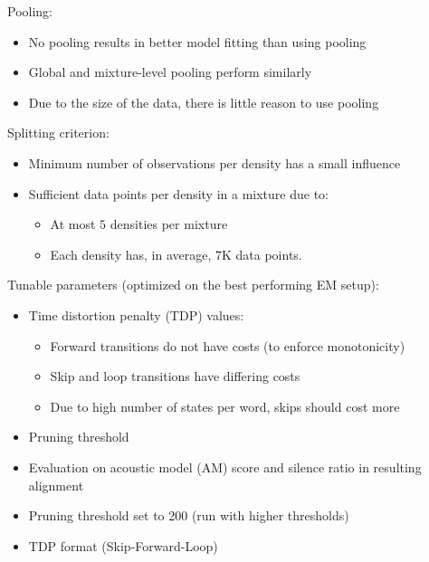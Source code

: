 \documentclass[11pt, a4paper, landscape]{article}
\begin{document}
\NewPage{}
\vfill
Pooling:
\begin{itemize}
	\item No pooling results in better model fitting than using pooling 
	\item Global and mixture-level pooling perform similarly 
  \item Due to the size of the data, there is little reason to use pooling
\end{itemize}
\vspace{20pt}
Splitting criterion:
\begin{itemize}
	\item Minimum number of observations per density has a small influence
	\item Sufficient data points per density in a mixture due to:
	\begin{itemize}
		\item At most $5$ densities per mixture
		\item Each density has, in average, $7$K data points.
	\end{itemize}
\end{itemize}
\vfill

\NewPage{}
\vfill
Tunable parameters (optimized on the best performing EM setup):
\begin{itemize}
	\item Time distortion penalty (TDP) values:
    \begin{itemize}
      \item Forward transitions do not have costs (to enforce monotonicity)
      \item Skip and loop transitions have differing costs
      \item Due to high number of states per word, skips should cost more
    \end{itemize}
	\item Pruning threshold
\end{itemize}
\vfill

\NewPage{}
\vfill
\begin{itemize}
  \item Evaluation on acoustic model (AM) score and silence ratio in resulting alignment
  \item Pruning threshold set to 200 (run with higher thresholds)
  \item TDP format (Skip-Forward-Loop) 
\end{itemize}
\end{document}
